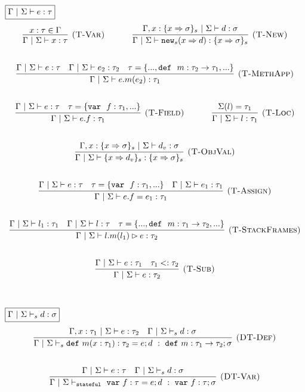 \documentclass{llncs}
\newcommand{\keywadj}[1]{\mathtt{#1}}
\newcommand{\keyw}[1]{\keywadj{#1}~}
\begin{document}
$\fbox{$\Gamma~|~\Sigma \vdash e : \tau$}$
\[
\begin{array}{c}
\infer[\textsc{(T-Var)}]
  {\Gamma~|~\Sigma \vdash x : \tau}
  {x : \tau \in \Gamma}%
~~~~~~~~~~
\infer[\textsc{(T-New)}]
	{\Gamma~|~\Sigma \vdash\keywadj{new}_{s}(x \Rightarrow d) : \{ x \Rightarrow \sigma \}_{s}}
	{\Gamma, x : \{ x \Rightarrow \sigma \}_{s}~|~\Sigma \vdash d : \sigma} \\[5ex]

\infer[\textsc{(T-MethApp)}]
	{\Gamma~|~\Sigma \vdash  e.m(e_2) : \tau_1} 
	{\Gamma~|~\Sigma \vdash e : \tau & \Gamma~|~\Sigma \vdash e_2 : \tau_2 & \tau=\{..., \keyw{def}~ m : \tau_2 \rightarrow \tau_1, ... \} }\\[5ex]

\infer[\textsc{(T-Field)}]
	{\Gamma~|~\Sigma \vdash  e.f : \tau_1} 
	{\Gamma~|~\Sigma \vdash e : \tau & \tau= \{\keyw{var}~ f : \tau_1,... \} }%
~~~~~~~~~~
\infer[\textsc{(T-Loc)}]
  {\Gamma~|~\Sigma \vdash l : \tau_1}
  {\Sigma(l) = \tau_1}\\[5ex]

\infer[\textsc{(T-ObjVal)}]
  {\Gamma~|~\Sigma \vdash \{ x \Rightarrow d_v \}_{s} : \{ x \Rightarrow \sigma \}_{s}}
  {\Gamma, x : \{ x \Rightarrow \sigma \}_{s}~|~\Sigma \vdash d_v : \sigma}\\[5ex]

\infer[\textsc{(T-Assign)}]
	{\Gamma~|~\Sigma \vdash  e.f=e_1 : \tau_1} 
	{\Gamma~|~\Sigma \vdash e : \tau & \tau = \{\keyw{var}~ f:\tau_1,... \} & \Gamma~|~\Sigma \vdash e_1 : \tau_1 }\\[5ex]

\infer[\textsc{(T-StackFrames)}]
	{\Gamma~|~\Sigma \vdash l.m(l_1) \rhd e : \tau_2}
	{\Gamma~|~\Sigma \vdash l_1 : \tau_1 & \Gamma~|~\Sigma \vdash l : \tau & \tau = \{..., \keyw{def}~ m : \tau_1 \rightarrow \tau_2, ... \}} \\[5ex]

\infer[\textsc{(T-Sub)}]
  {\Gamma~|~\Sigma \vdash e : \tau_2}
  {\Gamma~|~\Sigma \vdash e : \tau_1 & \tau_1 <: \tau_2}\\[5ex]

\end{array}
\]

$\fbox{$\Gamma~|~\Sigma \vdash_s d : \sigma$}$
\[
\begin{array}{c}
\infer[\textsc{(DT-Def)}]
  {\Gamma~|~\Sigma \vdash_s \keyw{def} m(x : \tau_1) : \tau_2 = e; d~:~\keyw{def} m : \tau_1 \rightarrow \tau_2; \sigma}
  {\Gamma, x : \tau_1~|~\Sigma \vdash e : \tau_2 & \Gamma~|~\Sigma \vdash_s d : \sigma}\\[5ex]

\infer[\textsc{(DT-Var)}]
  {\Gamma~|~\Sigma \vdash_{\keyw{stateful}} \keyw{var} f : \tau = e; d~:~\keyw{var} f : \tau; \sigma}
  {\Gamma~|~\Sigma \vdash e : \tau & \Gamma~|~\Sigma \vdash_s d : \sigma}\\[5ex]

\end{array}
\]
\end{document}
